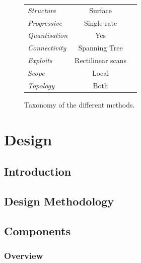 \documentclass{report}
\begin{document}
\begin{figure}
{\begin{tabular}{||l|c|c||}
  \hline

  \emph{Structure} & Surface & \\

  \emph{Progressive} & Single-rate & \\  

  \emph{Quantisation} & Yes & \\

  \emph{Connectivity} & Spanning Tree & \\

  \emph{Exploits} & Rectilinear scans & \\

  \emph{Scope} & Local & \\

  \emph{Topology} & Both & \\

  \hline
\end{tabular}
}
\caption{Taxonomy of the different methods.}\label{fig:taxonomy}
\end{figure}


\chapter{Design}

\section{Introduction}

\section{Design Methodology}

\section{Components}

\subsection{Overview}


\nocite{*}

\end{document}
